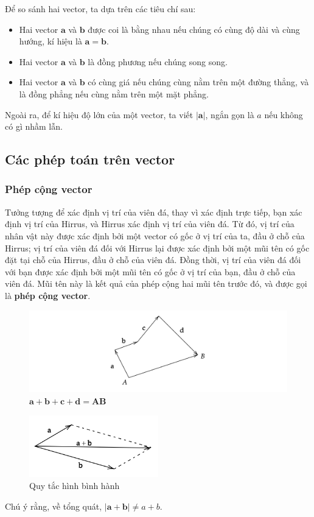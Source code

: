 Để so sánh hai vector, ta dựa trên các tiêu chí sau:
    \begin{itemize}
        \item Hai vector \(\mathbf{a}\) và \(\mathbf{b}\) được coi là bằng nhau nếu chúng có cùng độ dài và cùng hướng, kí hiệu là \(\mathbf{a}=\mathbf{b}\).
        \item Hai vector \(\mathbf{a}\) và \(\mathbf{b}\) là đồng phương nếu chúng song song.
        \item Hai vector \(\mathbf{a}\) và \(\mathbf{b}\) có cùng giá nếu chúng cùng nằm trên một đường thẳng, và là đồng phẳng nếu cùng nằm trên một mặt phẳng.
    \end{itemize}

Ngoài ra, để kí hiệu độ lớn của một vector, ta viết \(\lvert \mathbf{a}\rvert\), ngắn gọn là \(a\) nếu không có gì nhầm lẫn.  
\subsection{Các phép toán trên vector}

\subsubsection{Phép cộng vector}
Tưởng tượng để xác định vị trí của viên đá, thay vì xác định trực tiếp, bạn xác định vị trí của Hirrus, và Hirrus xác định vị trí của viên đá. Từ đó, vị trí của nhân vật này được xác định bởi một vector có gốc ở vị trí của ta, đầu ở chỗ của Hirrus; vị trí của viên đá đối với Hirrus lại được xác định bởi một mũi tên có gốc đặt tại chỗ của Hirrus, đầu ở chỗ của viên đá. Đồng thời, vị trí của viên đá đối với bạn được xác định bởi một mũi tên có gốc ở vị trí của bạn, đầu ở chỗ của viên đá. Mũi tên này là kết quả của phép cộng hai mũi tên trước đó, và được gọi là \textbf{phép cộng vector}.
\begin{figure}[H]
    \centering
    \includegraphics[width=1\textwidth]{Tuan2/Figures/congvector.png}
    \caption{$\mathbf{a}+\mathbf{b}+\mathbf{c}+\mathbf{d}=\mathbf{AB}$}
\end{figure}
\begin{figure}[H]
    \centering
    \includegraphics[width=0.5\textwidth]{Tuan2/Figures/quy_tac_hbh.png}
    \caption{Quy tắc hình bình hành}
\end{figure}
Chú ý rằng, về tổng quát, \(\lvert \mathbf{a}+\mathbf{b}\rvert\neq a+b\).
